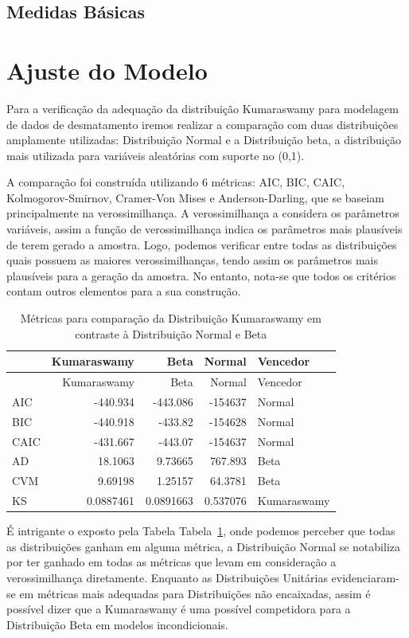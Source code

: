 \documentclass[
]{article}
\begin{document}
\subsection{Medidas Básicas}

\section{\centering Ajuste do Modelo}

Para a verificação da adequação da distribuição Kumaraswamy para
modelagem de dados de desmatamento iremos realizar a comparação com duas
distribuições amplamente utilizadas: Distribuição Normal e a
Distribuição beta, a distribuição mais utilizada para variáveis
aleatórias com suporte no (0,1).

A comparação foi construída utilizando 6 métricas: AIC, BIC, CAIC,
Kolmogorov-Smirnov, Cramer-Von Mises e Anderson-Darling, que se baseiam
principalmente na verossimilhança. A verossimilhança a considera os
parâmetros variáveis, assim a função de verossimilhança indica os
parâmetros mais plausíveis de terem gerado a amostra. Logo, podemos
verificar entre todas as distribuições quais possuem as maiores
verossimilhanças, tendo assim os parâmetros mais plausíveis para a
geração da amostra. No entanto, nota-se que todos os critérios contam
outros elementos para a sua construção.

\hypertarget{tbl-planet-measures}{}
\begin{longtable}[]{@{}lrrrl@{}}
\caption{\label{tbl-planet-measures}Métricas para comparação da
Distribuição Kumaraswamy em contraste à Distribuição Normal e
Beta}\tabularnewline
\toprule()
& Kumaraswamy & Beta & Normal & Vencedor \\
\midrule()
\endfirsthead
\toprule()
& Kumaraswamy & Beta & Normal & Vencedor \\
\midrule()
\endhead
AIC & -440.934 & -443.086 & -154637 & Normal \\
BIC & -440.918 & -433.82 & -154628 & Normal \\
CAIC & -431.667 & -443.07 & -154637 & Normal \\
AD & 18.1063 & 9.73665 & 767.893 & Beta \\
CVM & 9.69198 & 1.25157 & 64.3781 & Beta \\
KS & 0.0887461 & 0.0891663 & 0.537076 & Kumaraswamy \\
\bottomrule()
\end{longtable}

É intrigante o exposto pela Tabela Tabela~\ref{tbl-planet-measures},
onde podemos perceber que todas as distribuições ganham em alguma
métrica, a Distribuição Normal se notabiliza por ter ganhado em todas as
métricas que levam em consideração a verossimilhança diretamente.
Enquanto as Distribuições Unitárias evidenciaram-se em métricas mais
adequadas para Distribuições não encaixadas, assim é possível dizer que
a Kumaraswamy é uma possível competidora para a Distribuição Beta em
modelos incondicionais.
\end{document}
